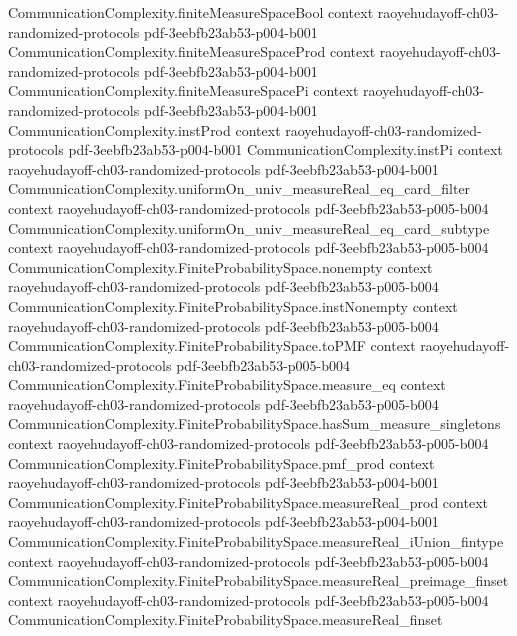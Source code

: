 \begin{theorem}
  {CommunicationComplexity.finiteMeasureSpaceBool}
  {context}
  {raoyehudayoff-ch03-randomized-protocols}
  {pdf-3eebfb23ab53-p004-b001}
\proofstep
  {CommunicationComplexity.finiteMeasureSpaceProd}
  {context}
  {raoyehudayoff-ch03-randomized-protocols}
  {pdf-3eebfb23ab53-p004-b001}
\proofstep
  {CommunicationComplexity.finiteMeasureSpacePi}
  {context}
  {raoyehudayoff-ch03-randomized-protocols}
  {pdf-3eebfb23ab53-p004-b001}
\proofstep
  {CommunicationComplexity.instProd}
  {context}
  {raoyehudayoff-ch03-randomized-protocols}
  {pdf-3eebfb23ab53-p004-b001}
\proofstep
  {CommunicationComplexity.instPi}
  {context}
  {raoyehudayoff-ch03-randomized-protocols}
  {pdf-3eebfb23ab53-p004-b001}
\proofstep
  {CommunicationComplexity.uniformOn_univ_measureReal_eq_card_filter}
  {context}
  {raoyehudayoff-ch03-randomized-protocols}
  {pdf-3eebfb23ab53-p005-b004}
\proofstep
  {CommunicationComplexity.uniformOn_univ_measureReal_eq_card_subtype}
  {context}
  {raoyehudayoff-ch03-randomized-protocols}
  {pdf-3eebfb23ab53-p005-b004}
\proofstep
  {CommunicationComplexity.FiniteProbabilitySpace.nonempty}
  {context}
  {raoyehudayoff-ch03-randomized-protocols}
  {pdf-3eebfb23ab53-p005-b004}
\proofstep
  {CommunicationComplexity.FiniteProbabilitySpace.instNonempty}
  {context}
  {raoyehudayoff-ch03-randomized-protocols}
  {pdf-3eebfb23ab53-p005-b004}
\proofstep
  {CommunicationComplexity.FiniteProbabilitySpace.toPMF}
  {context}
  {raoyehudayoff-ch03-randomized-protocols}
  {pdf-3eebfb23ab53-p005-b004}
\proofstep
  {CommunicationComplexity.FiniteProbabilitySpace.measure_eq}
  {context}
  {raoyehudayoff-ch03-randomized-protocols}
  {pdf-3eebfb23ab53-p005-b004}
\proofstep
  {CommunicationComplexity.FiniteProbabilitySpace.hasSum_measure_singletons}
  {context}
  {raoyehudayoff-ch03-randomized-protocols}
  {pdf-3eebfb23ab53-p005-b004}
\proofstep
  {CommunicationComplexity.FiniteProbabilitySpace.pmf_prod}
  {context}
  {raoyehudayoff-ch03-randomized-protocols}
  {pdf-3eebfb23ab53-p004-b001}
\proofstep
  {CommunicationComplexity.FiniteProbabilitySpace.measureReal_prod}
  {context}
  {raoyehudayoff-ch03-randomized-protocols}
  {pdf-3eebfb23ab53-p004-b001}
\proofstep
  {CommunicationComplexity.FiniteProbabilitySpace.measureReal_iUnion_fintype}
  {context}
  {raoyehudayoff-ch03-randomized-protocols}
  {pdf-3eebfb23ab53-p005-b004}
\proofstep
  {CommunicationComplexity.FiniteProbabilitySpace.measureReal_preimage_finset}
  {context}
  {raoyehudayoff-ch03-randomized-protocols}
  {pdf-3eebfb23ab53-p005-b004}
\proofstep
  {CommunicationComplexity.FiniteProbabilitySpace.measureReal_finset}

\end{theorem}
